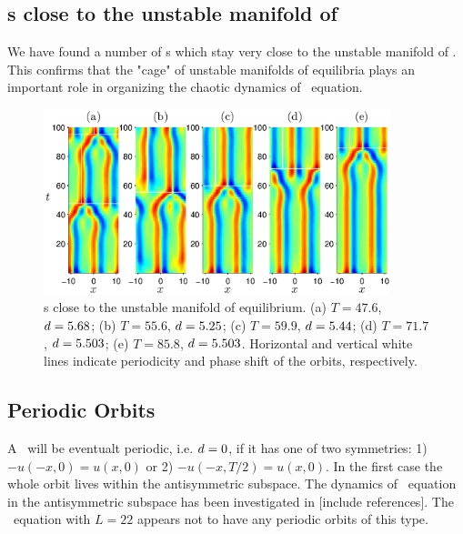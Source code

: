 \subsection{\Rpo s close to the unstable manifold of  }
We have found a number of \rpo s which stay very close to the
unstable manifold of .  This confirms that the "cage" of
unstable manifolds of equilibria plays an important role in
organizing the chaotic dynamics of \KS\ equation.

\begin{figure}[t]
\begin{center}
\includegraphics[width=0.9\textwidth]{figs/ks22rposCage.eps}
\end{center}
\caption{\Rpo s close to the unstable manifold of 
equilibrium. (a) $T = 47.6$, $d = 5.68$; (b) $T = 55.6$,
$d = 5.25$; (c) $T = 59.9$, $d = 5.44$; (d) $T = 71.7$,
$d = 5.503$; (e) $T = 85.8$, $d = 5.503$. Horizontal and
vertical white lines indicate periodicity and phase shift of the
orbits, respectively. }\label{f:ks22rposCage}
\end{figure}

\subsection{Periodic Orbits} \label{ssec:po}
A \rpo\ will be eventualt periodic, i.e. $d = 0$, if it has one of
two symmetries: 1) $-u(-x,0) = u(x,0)$ or 2) $-u(-x,T/2) =
u(x,0)$. In the
first case the whole orbit lives within the antisymmetric subspace.
The dynamics of \KS\ equation in the antisymmetric subspace has been
investigated in [include references]. The \KS\ equation with $L =
22$ appears not to have any periodic orbits of this type.

